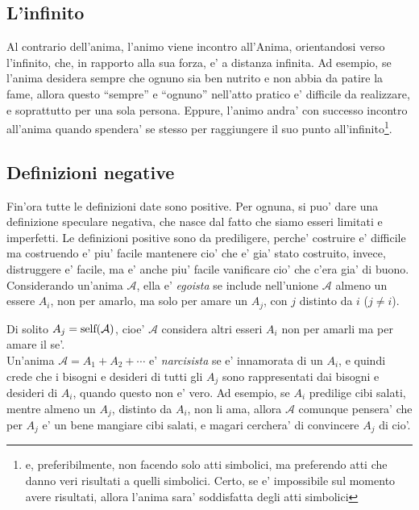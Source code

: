 \subsection{L'infinito}

Al contrario dell'anima, l'animo viene incontro all'Anima, orientandosi verso l'infinito, che, in rapporto alla sua forza, e' a distanza infinita. Ad esempio, se l'anima desidera sempre che ognuno sia ben nutrito e non abbia da patire la fame, allora questo ``sempre'' e ``ognuno'' nell'atto pratico e' difficile da realizzare, e soprattutto per una sola persona. Eppure, l'animo andra' con successo incontro all'anima quando spendera' se stesso per raggiungere il suo punto all'infinito\footnote{e, preferibilmente, non facendo solo atti simbolici, ma preferendo atti che danno veri risultati a quelli simbolici. Certo, se e' impossibile sul momento avere risultati, allora l'anima sara' soddisfatta degli atti simbolici}.


\subsection{Definizioni negative}

Fin'ora tutte le definizioni date sono positive. Per ognuna, si puo' dare una definizione speculare negativa, che nasce dal fatto che siamo esseri limitati e imperfetti. Le definizioni positive sono da prediligere, perche' costruire e' difficile ma costruendo e' piu' facile mantenere cio' che e' gia' stato costruito, invece, distruggere e' facile, ma e' anche piu' facile vanificare cio' che c'era gia' di buono.\\

Considerando un'anima $\mathcal{A}$, ella e' \emph{egoista} se include nell'unione $\mathcal{A}$ almeno un essere $A_i$, non per amarlo, ma solo per amare un $A_j$, con $j$ distinto da $i$ ($j\ne i$).

Di solito $A_j = \textrm{self}(\mathcal{A})$, cioe' $\mathcal{A}$ considera altri esseri $A_i$ non per amarli ma per amare il se'.\\

Un'anima $\mathcal{A}=A_1+A_2+\cdots$ e' \emph{narcisista} se e' innamorata di un $A_i$, e quindi crede che i bisogni e desideri di tutti gli $A_j$ sono rappresentati dai bisogni e desideri di $A_i$, quando questo non e' vero. Ad esempio, se $A_i$ predilige cibi salati, mentre almeno un $A_j$, distinto da $A_i$, non li ama, allora $\mathcal{A}$ comunque pensera' che per $A_j$ e' un bene mangiare cibi salati, e magari cerchera' di convincere $A_j$ di cio'.

